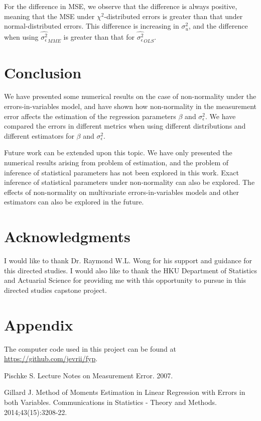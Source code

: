 \documentclass{article}
\begin{document}
For the difference in MSE, we observe that the difference is always positive, meaning that the MSE under $\chi^2$-distributed errors is greater than that under normal-distributed errors.
This difference is increasing in $\sigma^2_u$, and the difference when using $\hat{\sigma^2_\epsilon}_{MME}$ is greater than that for $\hat{\sigma^2_\epsilon}_{OLS}$.

\section{Conclusion}

We have presented some numerical results on the case of non-normality under the errors-in-variables model,
and have shown how non-normality in the measurement error affects the estimation of the regression parameters $\beta$ and $\sigma^2_\epsilon$. 
We have compared the errors in different metrics when using different distributions and different estimators for $\beta$ and $\sigma^2_\epsilon$.

Future work can be extended upon this topic.
We have only presented the numerical results arising from problem of estimation,
and the problem of inference of statistical parameters has not been explored in this work.
Exact inference of statistical parameters under non-normality can also be explored.
The effects of non-normality on multivariate errors-in-variables models and other estimators can also be explored in the future.

\section{Acknowledgments}

I would like to thank Dr. Raymond W.L. Wong for his support and guidance for this directed studies.
I would also like to thank the HKU Department of Statistics and Actuarial Science for providing me with this opportunity to pursue in this directed studies capstone project.

\section{Appendix}

The computer code used in this project can be found at \url{https://github.com/jevrii/fyp}.



\begin{thebibliography}{9}

    Pischke S. Lecture Notes on Measurement Error. 2007.

    Gillard J. Method of Moments Estimation in Linear Regression with Errors in both Variables. Communications in Statistics - Theory and Methods. 2014;43(15):3208-22.
\end{thebibliography}
\end{document}
